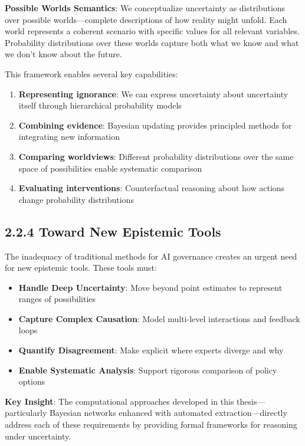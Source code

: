 \documentclass[
  11pt,
  letterpaper,
]{book}
\providecommand{\tightlist}{%
  \setlength{\itemsep}{0pt}\setlength{\parskip}{0pt}}
\begin{document}
\textbf{Possible Worlds Semantics}: We conceptualize uncertainty as
distributions over possible worlds---complete descriptions of how
reality might unfold. Each world represents a coherent scenario with
specific values for all relevant variables. Probability distributions
over these worlds capture both what we know and what we don't know about
the future.

This framework enables several key capabilities:

\begin{enumerate}
\def\labelenumi{\arabic{enumi}.}
\tightlist
\item
  \textbf{Representing ignorance}: We can express uncertainty about
  uncertainty itself through hierarchical probability models
\item
  \textbf{Combining evidence}: Bayesian updating provides principled
  methods for integrating new information
\item
  \textbf{Comparing worldviews}: Different probability distributions
  over the same space of possibilities enable systematic comparison
\item
  \textbf{Evaluating interventions}: Counterfactual reasoning about how
  actions change probability distributions
\end{enumerate}

\subsection{2.2.4 Toward New Epistemic
Tools}\label{toward-new-epistemic-tools}

The inadequacy of traditional methods for AI governance creates an
urgent need for new epistemic tools. These tools must:

\begin{itemize}
\tightlist
\item
  \textbf{Handle Deep Uncertainty}: Move beyond point estimates to
  represent ranges of possibilities
\item
  \textbf{Capture Complex Causation}: Model multi-level interactions and
  feedback loops
\item
  \textbf{Quantify Disagreement}: Make explicit where experts diverge
  and why
\item
  \textbf{Enable Systematic Analysis}: Support rigorous comparison of
  policy options
\end{itemize}

\textbf{Key Insight}: The computational approaches developed in this
thesis---particularly Bayesian networks enhanced with automated
extraction---directly address each of these requirements by providing
formal frameworks for reasoning under uncertainty.
\end{document}
